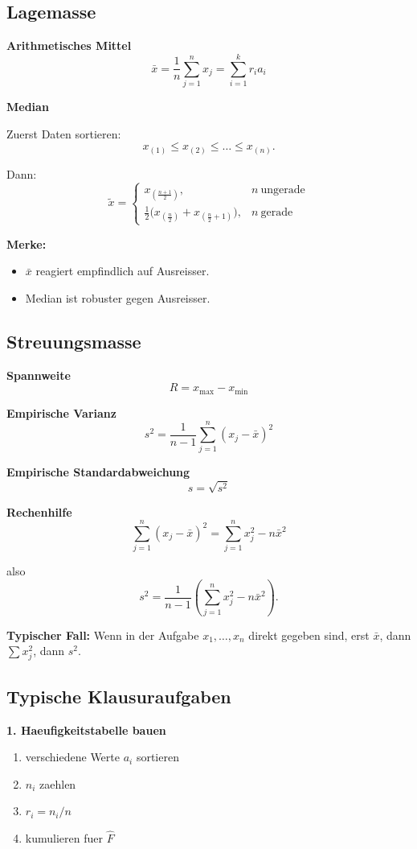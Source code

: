 \documentclass[a4paper,11pt]{article}
\begin{document}
\subsection{Lagemasse}
\textbf{Arithmetisches Mittel}
\[
\bar x=\frac{1}{n}\sum_{j=1}^n x_j=\sum_{i=1}^k r_i a_i
\]

\textbf{Median}

Zuerst Daten sortieren:
\[
x_{(1)}\le x_{(2)}\le \dots \le x_{(n)}.
\]

Dann:
\[
\tilde x=
\begin{cases}
x_{(\frac{n+1}{2})},& n\ \text{ungerade}\\[1mm]
\frac12\bigl(x_{(\frac n2)}+x_{(\frac n2+1)}\bigr),& n\ \text{gerade}
\end{cases}
\]

\textbf{Merke:}
\begin{itemize}
  \item $\bar x$ reagiert empfindlich auf Ausreisser.
  \item Median ist robuster gegen Ausreisser.
\end{itemize}

\subsection{Streuungsmasse}
\textbf{Spannweite}
\[
R=x_{\max}-x_{\min}
\]

\textbf{Empirische Varianz}
\[
s^2=\frac{1}{n-1}\sum_{j=1}^n (x_j-\bar x)^2
\]

\textbf{Empirische Standardabweichung}
\[
s=\sqrt{s^2}
\]

\textbf{Rechenhilfe}
\[
\sum_{j=1}^n (x_j-\bar x)^2=\sum_{j=1}^n x_j^2-n\bar x^2
\]

also
\[
s^2=\frac{1}{n-1}\left(\sum_{j=1}^n x_j^2-n\bar x^2\right).
\]

\textbf{Typischer Fall:}
Wenn in der Aufgabe $x_1,\dots,x_n$ direkt gegeben sind, erst $\bar x$, dann $\sum x_j^2$, dann $s^2$.

\subsection{Typische Klausuraufgaben}
\textbf{1. Haeufigkeitstabelle bauen}
\begin{enumerate}
  \item verschiedene Werte $a_i$ sortieren
  \item $n_i$ zaehlen
  \item $r_i=n_i/n$
  \item kumulieren fuer $\hat F$
\end{enumerate}
\end{document}
